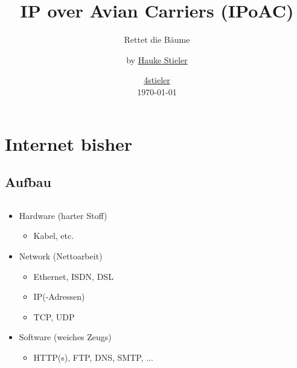 \documentclass{beamer}
\title{IP over Avian Carriers (IPoAC)}
\subtitle{\small Rettet die Bäume}%
\author{by \href{http://hauke-stieler.de/}{Hauke Stieler}\vspace{-6ex}}
\date{\vspace{50pt}\href{http://hauke-stieler.de/}{\scriptsize{4stieler}}\\\vspace{-30pt}\today}
\begin{document}
	\begin{frame}
		\maketitle
	\end{frame}
	\begin{frame}
		\tableofcontents[hideallsubsections]
	\end{frame}
	\section{Internet bisher}
	\subsection{Aufbau}
	\begin{frame}
		\begin{columns}
			\begin{column}{0.5\textwidth}
				\begin{itemize}
					\item Hardware (harter Stoff)
					\begin{itemize}
						\item Kabel, etc.
					\end{itemize}\pause
					\item Network (Nettoarbeit)
					\begin{itemize}
						\item Ethernet, ISDN, DSL
						\item IP(-Adressen)
						\item TCP, UDP
					\end{itemize}\pause
					\item Software (weiches Zeugs)
					\begin{itemize}
						\item HTTP(s), FTP, DNS, SMTP, ...
					\end{itemize}
				\end{itemize}
			\end{column}
			\begin{column}{0.4\textwidth}
				\begin{figure}[ht]

\end{figure}
\end{column}
\end{columns}
\end{frame}
\end{document}
